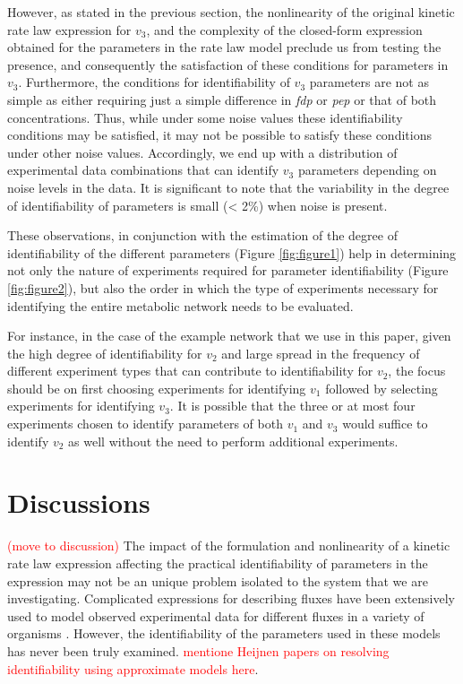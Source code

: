 \documentclass[10pt]{article}
\begin{document}
	However, as stated in the previous section, the nonlinearity of the original kinetic rate law expression for $v_3$, and the complexity of the closed-form expression obtained for the parameters in the rate law model preclude us from testing the presence, and consequently the satisfaction of these conditions for parameters in $v_3$. Furthermore, the conditions for identifiability of $v_3$ parameters are not as simple as either requiring just a simple difference in \textit{fdp} or \textit{pep} or that of both concentrations. Thus, while under some noise values these identifiability conditions may be satisfied, it may not be possible to satisfy these conditions under other noise values. Accordingly, we end up with a distribution of experimental data combinations that can identify $v_3$ parameters depending on noise levels in the data. It is significant to note that the variability in the degree of identifiability of parameters is small (< 2\%) when noise is present.
	
	These observations, in conjunction with the estimation of the degree of identifiability of the different parameters (Figure \ref{fig:figure1}) help in determining not only the nature of experiments required for parameter identifiability (Figure \ref{fig:figure2}), but also the order in which the type of experiments necessary for identifying the entire metabolic network needs to be evaluated.
	
	For instance, in the case of the example network that we use in this paper, given the high degree of identifiability for $v_2$ and large spread in the frequency of different experiment types that can contribute to identifiability for $v_2$, the focus should be on first choosing experiments for identifying $v_1$ followed by selecting experiments for identifying $v_3$. It is possible that the three or at most four experiments chosen to identify parameters of both $v_1$ and $v_3$ would suffice to identify $v_2$ as well without the need to perform additional experiments.	
	
	\section{Discussions}\label{sec:discussion}	
	\textcolor{red}{(move to discussion)} The impact of the formulation and nonlinearity of a kinetic rate law expression affecting the practical identifiability of parameters in the expression may not be an unique problem isolated to the system that we are investigating. Complicated expressions for describing fluxes have been extensively used to model observed experimental data for different fluxes in a variety of organisms \parencite{Chassagnole2002a, Peskov2012, VanHeerden2014}. However, the identifiability of the parameters used in these models has never been truly examined. \textcolor{red}{mentione Heijnen papers on resolving identifiability using approximate models here}.
	
\end{document}
